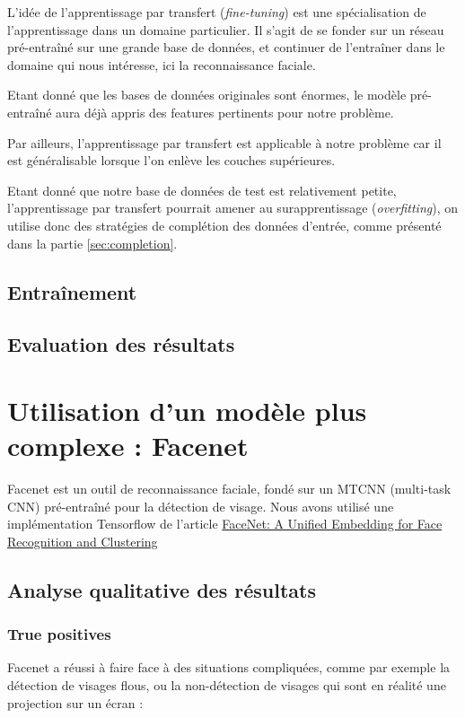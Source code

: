 \documentclass[a4paper,11pt]{article}
\begin{document}
L'idée de l'apprentissage par transfert (\textit{fine-tuning}) est une spécialisation de
l'apprentissage dans un domaine particulier. Il s'agit de se fonder sur un réseau pré-entraîné sur
une grande base de données, et continuer de l'entraîner dans le domaine qui nous intéresse, ici la reconnaissance faciale.

Etant donné que les bases de données originales sont énormes, le modèle pré-entraîné aura déjà appris des features pertinents pour notre problème.

Par ailleurs, l'apprentissage par transfert est applicable à notre problème car il est généralisable
lorsque l'on enlève les couches supérieures.

Etant donné que notre base de données de test est relativement petite, l'apprentissage par transfert pourrait amener au surapprentissage (\textit{overfitting}), on utilise donc des stratégies de complétion des données d'entrée, comme présenté dans la partie \ref{sec:completion}.

    \subsection{Entraînement}
    \subsection{Evaluation des résultats}

\section{Utilisation d'un modèle plus complexe : Facenet}

    Facenet est un outil de reconnaissance faciale, fondé sur un MTCNN (multi-task CNN) pré-entraîné pour la détection de visage. Nous avons utilisé une implémentation Tensorflow de l'article \href{https://arxiv.org/abs/1503.03832}{FaceNet: A Unified Embedding for Face Recognition and Clustering}

    \subsection{Analyse qualitative des résultats}
	\subsubsection{True positives}

	    Facenet a réussi à faire face à des situations compliquées, comme par exemple la détection de visages flous, ou la non-détection de visages qui sont en réalité une projection sur un écran :\\
	    
\end{document}
